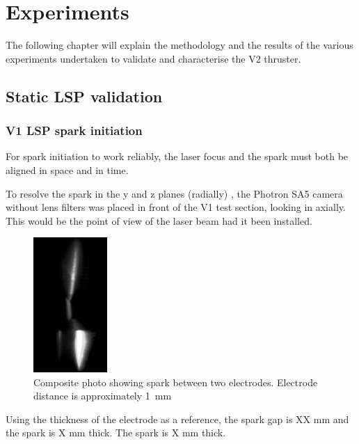 \chapter{Experiments}

    The following chapter will explain the methodology and the results of the various experiments undertaken to validate and characterise the V2 thruster.

    \section{Static LSP validation}

        \subsection{V1 LSP spark initiation}

            For spark initiation to work reliably, the laser focus and the spark must both be aligned in space and in time.

            To resolve the spark in the y and z planes (radially) , the Photron SA5 camera without lens filters was placed in front of the V1 test section, looking in axially. This would be the point of view of the laser beam had it been installed. 

            \begin{figure}[!ht]
                \centering
                \includegraphics[width=0.25\textwidth]{assets/4 experiments/Composite photo spark.png}
                \caption{Composite photo showing spark between two electrodes. Electrode distance is approximately \qty{1}{mm}}
            \end{figure}
            
            Using the thickness of the electrode as a reference, the spark gap is XX mm and the spark is X mm thick. 
            The spark is  X mm thick.
            
